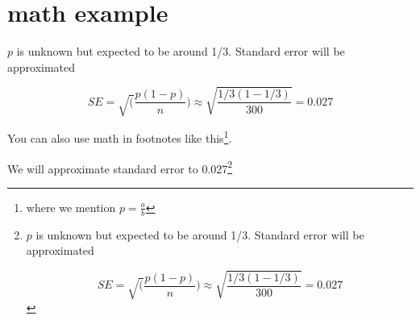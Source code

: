 \documentclass[
]{book}
\begin{document}
\hypertarget{math-example}{%
\section{math example}\label{math-example}}

\(p\) is unknown but expected to be around 1/3. Standard error will be approximated

\[
SE = \sqrt(\frac{p(1-p)}{n}) \approx \sqrt{\frac{1/3 (1 - 1/3)} {300}} = 0.027
\]

You can also use math in footnotes like this\footnote{where we mention \(p = \frac{a}{b}\)}.

We will approximate standard error to 0.027\footnote{\(p\) is unknown but expected to be around 1/3. Standard error will be approximated

  \[
  SE = \sqrt(\frac{p(1-p)}{n}) \approx \sqrt{\frac{1/3 (1 - 1/3)} {300}} = 0.027
  \]}

  
\end{document}
